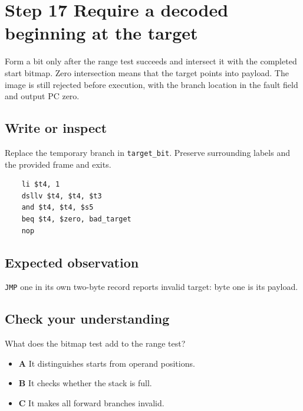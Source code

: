 \section{Step 17 Require a decoded beginning at the target}\label{vm-s17}

Form a bit only after the range test succeeds and intersect it with the completed start bitmap. Zero intersection means that the target points into payload. The image is still rejected before execution, with the branch location in the fault field and output PC zero.

\subsection{Write or inspect}
Replace the temporary branch in \texttt{target\_bit}. Preserve surrounding labels and the provided frame and exits.

\begin{verbatim}
    li $t4, 1
    dsllv $t4, $t4, $t3
    and $t4, $t4, $s5
    beq $t4, $zero, bad_target
    nop
\end{verbatim}
\subsection{Expected observation}
\texttt{JMP} one in its own two-byte record reports invalid target: byte one is its payload.

\subsection{Check your understanding}
What does the bitmap test add to the range test?

\begin{itemize}
  \item \textbf{A} It distinguishes starts from operand positions.
  \item \textbf{B} It checks whether the stack is full.
  \item \textbf{C} It makes all forward branches invalid.
\end{itemize}
